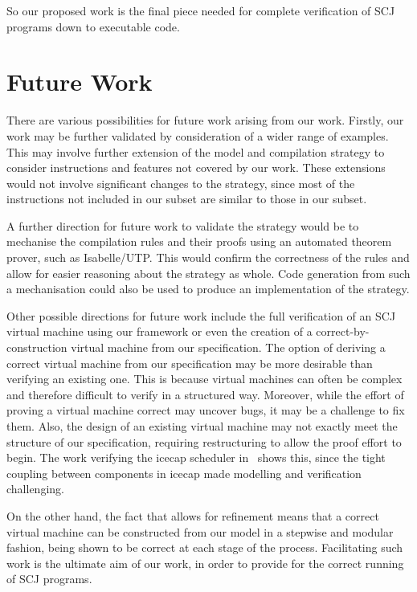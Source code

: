 So our proposed work is the final piece needed for complete
verification of SCJ programs down to executable code.

\section{Future Work}
\label{future-work-section}

There are various possibilities for future work arising from our work.
Firstly, our work may be further validated by consideration of a wider
range of examples.
This may involve further extension of the model and compilation
strategy to consider instructions and features not covered by our
work.
These extensions would not involve significant changes to the
strategy, since most of the instructions not included in our subset
are similar to those in our subset.

A further direction for future work to validate the strategy would be
to mechanise the compilation rules and their proofs using an automated
theorem prover, such as Isabelle/UTP.
This would confirm the correctness of the rules and allow for easier
reasoning about the strategy as whole.
Code generation from such a mechanisation could also be used to
produce an implementation of the strategy.

Other possible directions for future work include the full
verification of an SCJ virtual machine using our framework or even the
creation of a correct-by-construction virtual machine from our
specification.
The option of deriving a correct virtual machine from our
specification may be more desirable than verifying an existing one.
This is because virtual machines can often be complex and therefore
difficult to verify in a structured way.
Moreover, while the effort of proving a virtual machine correct may
uncover bugs, it may be a challenge to fix them.
Also, the design of an existing virtual machine may not exactly meet
the structure of our specification, requiring restructuring to allow
the proof effort to begin.
The work verifying the icecap scheduler in~\cite{freitas2016} shows
this, since the tight coupling between components in icecap made
modelling and verification challenging.

On the other hand, the fact that \Circus{} allows for refinement means
that a correct virtual machine can be constructed from our model in a
stepwise and modular fashion, being shown to be correct at each stage
of the process.
Facilitating such work is the ultimate aim of our work, in order to
provide for the correct running of SCJ programs.

